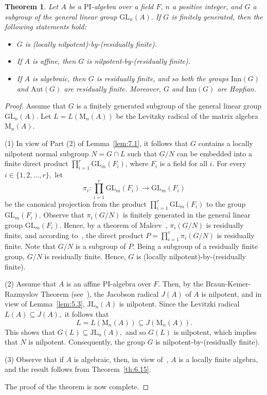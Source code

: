 \documentclass{amsart}
\newtheorem{theorem}{Theorem}[section]
\theoremstyle{definition}
\begin{document}
\begin{theorem}\label{th:7.5} Let $A$ be a $\mathrm{PI}$-algebra over a field $F$, $n$ a positive integer, and $G$ a subgroup of the general linear group $\mathrm{GL}_n(A).$ If $G$ is finitely generated, then the following statements hold:
	\begin{itemize}
		\item [(1)] $G$ is (locally nilpotent)-by-(residually finite).
		\item [(2)] If $A$ is affine, then $G$ is nilpotent-by-(residually finite). 
		\item [(3)] If $A$ is algebraic, then $G$ is residually finite, and so both the groups $\mathrm{Inn}(G)$ and $\mathrm{Aut}(G)$ are residually finite. Moreover, $G$ and $\mathrm{Inn}(G)$ are Hopfian. 
	\end{itemize}	
\end{theorem}
\begin{proof}  Assume that $G$ is a finitely generated subgroup of the general linear group $\mathrm{GL}_n(A).$ Let $L=L(\mathrm{M}_n(A))$ be the Levitzky radical of the matrix algebra $\mathrm{M}_n(A)$.
	
(1) In view of Part (2) of Lemma~\ref{lem:7.1}, it follows that $G$ contains a locally nilpotent normal subgroup $N=G\cap L$ such that $G/N$ can be embedded into a finite direct product $\prod_{i=1}^{r}\mathrm{GL}_m(F_i)$, where  $F_i$ is a field for all $i$. For every $i\in\{1,2,\ldots, r\},$ let $$\pi_i: \prod_{i=1}^{r}\mathrm{GL}_m(F_i)\longrightarrow \mathrm{GL}_m(F_i)$$ be the canonical projection from the product $\prod_{i=1}^{r}\mathrm{GL}_m(F_i)$ to the group $\mathrm{GL}_m(F_i)$. Observe that $\pi_i(G/N)$ is finitely generated in the general linear group $\mathrm{GL}_m(F_i).$ Hence, by a theorem of Malcev~\cite{Pa_mal'cev_1940}, $\pi_i(G/N)$ is residually finite, and according to~\cite[Proposition 2.2.2]{Bo_SilberCoor_2010}, the direct product $P=\prod_{i=1}^{r} \pi_i(G/N)$ is residually finite. Note that $G/N$ is a subgroup of $P.$ Being a subgroup of a residually finite group, $G/N$ is residually finite. Hence, $G$ is (locally nilpotent)-by-(residually finite). 
	
(2) Assume that $A$ is an affine $\mathrm{PI}$-algebra over $F.$ Then, by the Braun-Kemer-Razmyslov Theorem (see~\cite[Theorem~ 1.2]{Pa_BelovRowen_2014}), the Jacobson radical $J(A)$ of $A$ is nilpotent, and in view of Lemma~\ref{lem:5.3}, $\mathrm{JL}_n(A)$ is nilpotent. Since the Levitzki radical $L(A)\subseteq J(A),$ it follows that  
$$L=L(\mathrm{M}_n(A))\subseteq J(\mathrm{M}_n(A)).$$
This shows that $G(L)\subseteq \mathrm{JL}_n(A),$ and so $G(L)$ is nilpotent, which implies that $N$ is nilpotent. Consequently, the group $G$ is nilpotent-by-(residually finite).
	
(3) Observe that if $A$ is algebraic, then, in view of~\cite[Ch.~10, \S12, Theorem 1]{Bo_Jacobson_1964}, $A$ is a locally finite algebra, and the result follows from Theorem~\ref{th:6.15}. 

The proof of the theorem is now complete. 
\end{proof}
\end{document}

